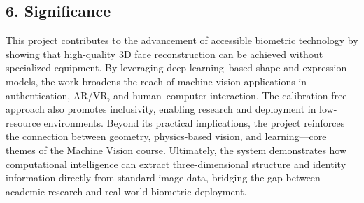 \documentclass[12pt]{article}
\begin{document}
\vspace{2em}

\subsection*{6. Significance}
This project contributes to the advancement of accessible biometric technology by showing that high-quality 3D face reconstruction can be achieved without specialized equipment. By leveraging deep learning–based shape and expression models, the work broadens the reach of machine vision applications in authentication, AR/VR, and human–computer interaction. The calibration-free approach also promotes inclusivity, enabling research and deployment in low-resource environments. Beyond its practical implications, the project reinforces the connection between geometry, physics-based vision, and learning—core themes of the Machine Vision course. Ultimately, the system demonstrates how computational intelligence can extract three-dimensional structure and identity information directly from standard image data, bridging the gap between academic research and real-world biometric deployment.
\end{document}
